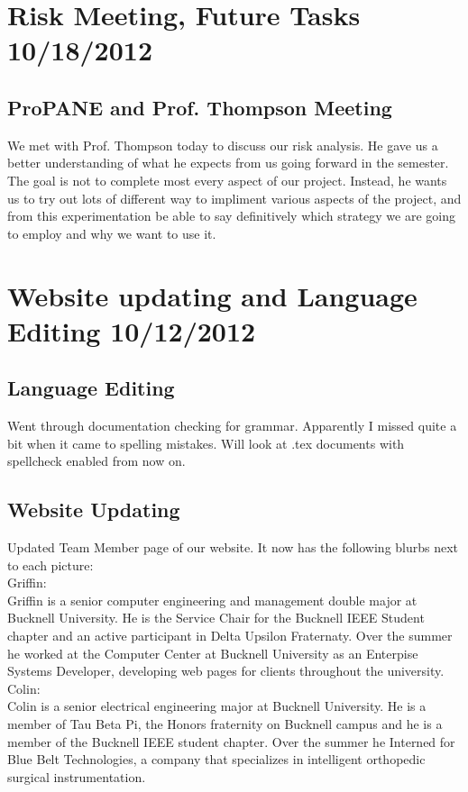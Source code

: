 \documentclass[]{article}
\begin{document}
	
	\section {Risk Meeting, Future Tasks 10/18/2012}
		\subsection{ProPANE and Prof. Thompson Meeting}
		We met with Prof. Thompson today to discuss our risk analysis. He gave us a better understanding of what he expects from us going forward in the semester.  The goal is not to complete most every aspect of our project. Instead, he wants us to try out lots of different way to impliment various aspects of the project, and from this experimentation be able to say definitively which strategy we are going to employ and why we want to use it. \\
	
	
	\section{Website updating and Language Editing 10/12/2012}

		\subsection{Language Editing}	
	Went through documentation checking for grammar. Apparently I missed quite a bit when it came to spelling mistakes. Will look at .tex documents with spellcheck enabled from now on. \\
	
		\subsection{Website Updating}
	Updated Team Member page of our website. It now has the following blurbs next to each picture: \\
	
	Griffin: \\
	Griffin is a senior computer engineering and management double major at Bucknell University. He is the Service Chair for the Bucknell IEEE Student chapter and an active participant in Delta Upsilon Fraternaty. Over the summer he worked at the Computer Center at Bucknell University as an Enterpise Systems Developer, developing web pages for clients throughout the university. \\
	
	Colin: \\
	Colin is a senior electrical engineering major at Bucknell University. He is a member of Tau Beta Pi, the Honors fraternity on Bucknell campus and he is a member of the Bucknell IEEE student chapter. Over the summer he Interned for Blue Belt Technologies, a company that specializes in intelligent orthopedic surgical instrumentation.\\
	
\end{document}
